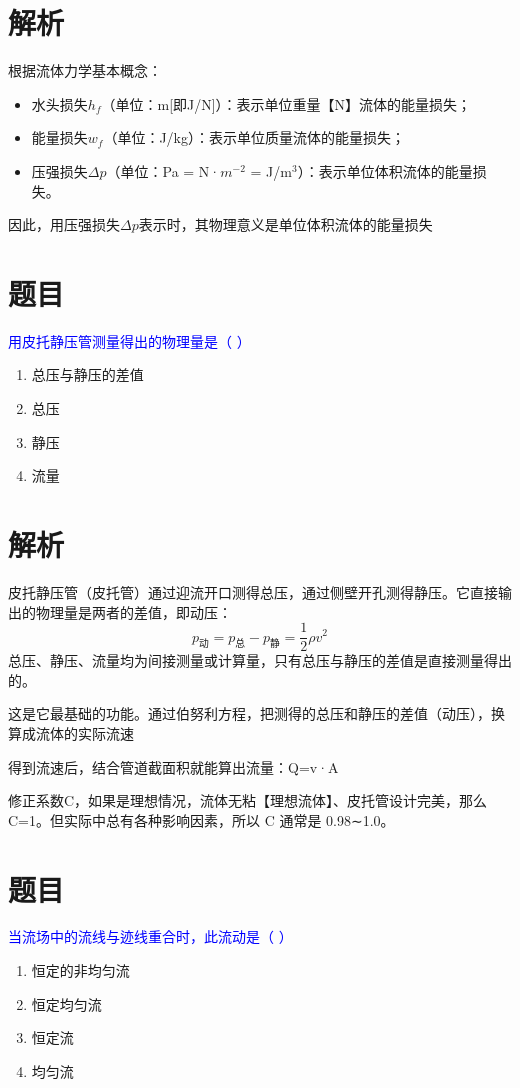 \documentclass[11pt,a4paper]{article}
\begin{document}
\section*{解析}
根据流体力学基本概念：
\begin{itemize}
    \item 水头损失$h_f$（单位：m[即J/N]）：表示单位重量【N】流体的能量损失；
    \item 能量损失$w_f$（单位：J/kg）：表示单位质量流体的能量损失；
    \item 压强损失$\Delta p$（单位：Pa = N·$m^{-2}$ = J/m$^3$）：表示单位体积流体的能量损失。
\end{itemize}
因此，用压强损失$\Delta p$表示时，其物理意义是单位体积流体的能量损失


\section*{题目}
\textcolor{blue}{用皮托静压管测量得出的物理量是（ ）}
\begin{enumerate}
    \item[A] 总压与静压的差值
    \item[B] 总压
    \item[C] 静压
    \item[D] 流量
\end{enumerate}

\section*{解析}
皮托静压管（皮托管）通过迎流开口测得总压，通过侧壁开孔测得静压。它直接输出的物理量是两者的差值，即动压：
\[
p_{\text{动}} = p_{\text{总}} - p_{\text{静}} = \frac{1}{2}\rho v^2
\]
总压、静压、流量均为间接测量或计算量，只有总压与静压的差值是直接测量得出的。

这是它最基础的功能。通过伯努利方程，把测得的总压和静压的差值（动压），换算成流体的实际流速

得到流速后，结合管道截面积就能算出流量：Q=v·A

修正系数C，如果是理想情况，流体无粘【理想流体】、皮托管设计完美，那么 C=1。但实际中总有各种影响因素，所以 C 通常是 0.98∼1.0。


\section*{题目}
\textcolor{blue}{当流场中的流线与迹线重合时，此流动是（ ）}
\begin{enumerate}
    \item[A] 恒定的非均匀流
    \item[B] 恒定均匀流
    \item[C] 恒定流
    \item[D] 均匀流
\end{enumerate}
\end{document}
